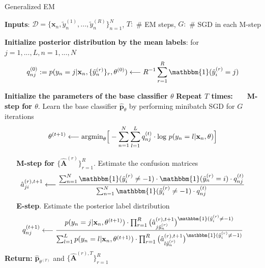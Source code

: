 \begin{algorithm}
	\caption{Generalized EM \cite{raykar2009supervised}}
	\label{alg:generalised_em}
	\small
	\begin{algorithmic}
		\State \textbf{Inputs}: $\mathcal{D} = \{\textbf{x}_n, \tilde{y}^{(1)}_{n},...,\tilde{y}^{(R)}_{n}\}_{n=1}^{N}$,
		$T:$ \# EM steps, $G:$ \# SGD in each M-step
		
		\State \textbf{Initialize posterior distribution by the mean labels}: for $j=1,..., L, n=1,...,N$
		\vspace{-2mm}
		$$q_{nj} ^{(0)}: = p(y_{n}=j|\textbf{x}_{n}, \{\tilde{y}^{(r)}_{n}\}_r, \theta^{(0)}) \longleftarrow R^{-1}\sum_{r=1}^R \mathbbm{1}(\tilde{y}_{i}^{(r)}=j) $$
		\vspace{-3mm}
		
		\State \textbf{Initialize the parameters of the base classifier $\theta$}
		\State \textbf{Repeat $T$ times:}
		\State $\,\,\,\,\,\,\,\,$ \textbf{M-step for $\theta$}. Learn the base classifier  $\hat{\mathbf{p}}_{\theta}$ by performing minibatch SGD for $G$ iterations 
		\vspace{-2mm}
		$$\theta^{(t+1)} \longleftarrow \text{argmin}_{\theta}\Big{[}-\sum_{n=1}^{N}\sum_{l=1}^{L}q_{nj} ^{(t)}\cdot \text{log } p(y_{n}=l|\mathbf{x}_{n}, \theta) \Big{]}$$ 
		\vspace{-3mm}
		
		\State $\,\,\,\,\,\,\,\,$ \textbf{M-step for $\{\hat{\mathbf{A}}^{(r)}\}_{r=1}^{R}$}. Estimate the confusion matrices 
		\vspace{-2mm}
		$$\hat{a}_{ji}^{(r),t+1} \longleftarrow \frac{\sum_{n=1}^{N}\mathbbm{1}(\tilde{y}_{i}^{(r)} \neq -1)\cdot \mathbbm{1}(\tilde{y}^{(r)}_{n}=i)\cdot q_{nj} ^{(t)}}{\sum_{n=1}^{N} \mathbbm{1}(\tilde{y}_{i}^{(r)} \neq -1)\cdot q_{nj} ^{(t)}}$$ 
		\vspace{-3mm}
		\State $\,\,\,\,\,\,\,\,$  \textbf{E-step}. Estimate the posterior label distribution
		\vspace{-2mm}
		$$q_{nj} ^{(t+1)} \longleftarrow \frac{ p(y_{n}=j|\mathbf{x}_{n}, \theta^{(t+1)})\cdot\prod_{r=1}^{R}\big{(}\hat{a}^{(r),t+1}_{j\tilde{y}^{(r)}_{n}}\big{)}^{\mathbbm{1}(\tilde{y}_{i}^{(r)} \neq -1)}}{\sum_{l=1}^L p(y_{n}=l|\mathbf{x}_{n}, \theta^{(t+1)})\cdot\prod_{r=1}^{R}\big{(}\hat{a}^{(r),t+1}_{l\tilde{y}^{(r)}_{n}}\big{)}^{\mathbbm{1}(\tilde{y}_{i}^{(r)} \neq -1)}}$$
		\vspace{-3mm}
		\State \textbf{Return:   } $\hat{\mathbf{p}}_{\theta^{(T)}}$ and $\{\hat{\mathbf{A}}^{(r),T}\}_{r=1}^R$
	\end{algorithmic}
\end{algorithm}



